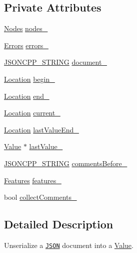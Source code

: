 \subsection*{Private Attributes}
\begin{DoxyCompactItemize}
\item 
\hyperlink{class_json_1_1_reader_a8da2114fe8b8124d41ea2f3434f0171b}{Nodes} \hyperlink{class_json_1_1_reader_ada3d2c47699dad662e6d156c8c78a6ac}{nodes\+\_\+}
\item 
\hyperlink{class_json_1_1_reader_aae51e8f5bab3f067261c842a3ef858e5}{Errors} \hyperlink{class_json_1_1_reader_a1bbce45dc4df753bed60c129f4b5147c}{errors\+\_\+}
\item 
\hyperlink{json_8h_a1e723f95759de062585bc4a8fd3fa4be}{J\+S\+O\+N\+C\+P\+P\+\_\+\+S\+T\+R\+I\+NG} \hyperlink{class_json_1_1_reader_abf99e137bc92a93623dc97598702261a}{document\+\_\+}
\item 
\hyperlink{class_json_1_1_reader_a46795b5b272bf79a7730e406cb96375a}{Location} \hyperlink{class_json_1_1_reader_a327166839022ea91f0a8290960a8af76}{begin\+\_\+}
\item 
\hyperlink{class_json_1_1_reader_a46795b5b272bf79a7730e406cb96375a}{Location} \hyperlink{class_json_1_1_reader_a714793579cbf4ee7c5a7223d2c8d77c1}{end\+\_\+}
\item 
\hyperlink{class_json_1_1_reader_a46795b5b272bf79a7730e406cb96375a}{Location} \hyperlink{class_json_1_1_reader_a2f2feb5201a26da7aa133d2f7434479b}{current\+\_\+}
\item 
\hyperlink{class_json_1_1_reader_a46795b5b272bf79a7730e406cb96375a}{Location} \hyperlink{class_json_1_1_reader_a497a114f7b760f1b794b8fff9876615a}{last\+Value\+End\+\_\+}
\item 
\hyperlink{class_json_1_1_value}{Value} $\ast$ \hyperlink{class_json_1_1_reader_a87cc75ae5adc6a6755f0ba1c7255ff6c}{last\+Value\+\_\+}
\item 
\hyperlink{json_8h_a1e723f95759de062585bc4a8fd3fa4be}{J\+S\+O\+N\+C\+P\+P\+\_\+\+S\+T\+R\+I\+NG} \hyperlink{class_json_1_1_reader_af777967adaf0b2e882efa07673754381}{comments\+Before\+\_\+}
\item 
\hyperlink{class_json_1_1_features}{Features} \hyperlink{class_json_1_1_reader_aa9984ff8f519b5541346157b7aebf97b}{features\+\_\+}
\item 
bool \hyperlink{class_json_1_1_reader_a8e9ce743f6004f0596692f0a9ee4626c}{collect\+Comments\+\_\+}
\end{DoxyCompactItemize}


\subsection{Detailed Description}
Unserialize a \href{http://www.json.org}{\tt J\+S\+ON} document into a \hyperlink{class_json_1_1_value}{Value}. 

